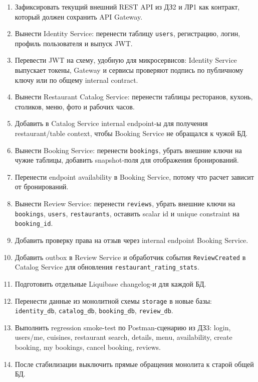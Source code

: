 \documentclass[14pt,a4paper]{extarticle}
\newcommand{\code}[1]{\texttt{#1}}
\begin{document}
\begin{enumerate}[leftmargin=1.7cm]
    \item Зафиксировать текущий внешний REST API из ДЗ2 и ЛР1 как контракт, который должен сохранить API Gateway.
    \item Вынести Identity Service: перенести таблицу \code{users}, регистрацию, логин, профиль пользователя и выпуск JWT.
    \item Перевести JWT на схему, удобную для микросервисов: Identity Service выпускает токены, Gateway и сервисы проверяют подпись по публичному ключу или по общему internal contract.
    \item Вынести Restaurant Catalog Service: перенести таблицы ресторанов, кухонь, столиков, меню, фото и рабочих часов.
    \item Добавить в Catalog Service internal endpoint-ы для получения restaurant/table context, чтобы Booking Service не обращался к чужой БД.
    \item Вынести Booking Service: перенести \code{bookings}, убрать внешние ключи на чужие таблицы, добавить snapshot-поля для отображения бронирований.
    \item Перенести endpoint availability в Booking Service, потому что расчет зависит от бронирований.
    \item Вынести Review Service: перенести \code{reviews}, убрать внешние ключи на \code{bookings}, \code{users}, \code{restaurants}, оставить scalar id и unique constraint на \code{booking\_id}.
    \item Добавить проверку права на отзыв через internal endpoint Booking Service.
    \item Добавить outbox в Review Service и обработчик события \code{ReviewCreated} в Catalog Service для обновления \code{restaurant\_rating\_stats}.
    \item Подготовить отдельные Liquibase changelog-и для каждой БД.
    \item Перенести данные из монолитной схемы \code{storage} в новые базы: \code{identity\_db}, \code{catalog\_db}, \code{booking\_db}, \code{review\_db}.
    \item Выполнить regression smoke-test по Postman-сценарию из ДЗ3: login, users/me, cuisines, restaurant search, details, menu, availability, create booking, my bookings, cancel booking, reviews.
    \item После стабилизации выключить прямые обращения монолита к старой общей БД.
\end{enumerate}
\end{document}
